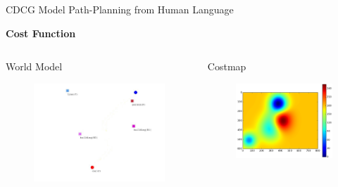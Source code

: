 \begin{frame}{CDCG}{ Model Path-Planning from Human Language }

{\bf Cost Function}	
	
\begin{columns}	
\begin{block}{World Model}
\begin{figure}
	\centering
	\includegraphics[width=.9\linewidth]{figure/world_model}
\end{figure}
\end{block}
\begin{block}{Costmap}
\begin{figure}
	\centering
	\includegraphics[width=.9\linewidth]{figure/costmap}
\end{figure}
\end{block}

\end{columns}
\end{frame}
